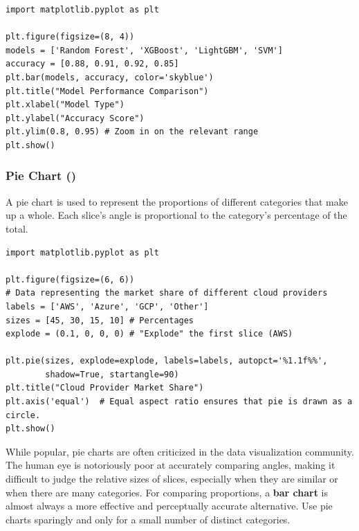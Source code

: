 \begin{example}
\text{ }\begin{verbatim}
import matplotlib.pyplot as plt

plt.figure(figsize=(8, 4))
models = ['Random Forest', 'XGBoost', 'LightGBM', 'SVM']
accuracy = [0.88, 0.91, 0.92, 0.85]
plt.bar(models, accuracy, color='skyblue')
plt.title("Model Performance Comparison")
plt.xlabel("Model Type")
plt.ylabel("Accuracy Score")
plt.ylim(0.8, 0.95) # Zoom in on the relevant range
plt.show()
\end{verbatim}
\end{example}

\subsubsection*{Pie Chart ()}
A pie chart is used to represent the proportions of different categories that make up a whole. Each slice's angle is proportional to the category's percentage of the total.

\begin{example}
\text{ }\begin{verbatim}
import matplotlib.pyplot as plt

plt.figure(figsize=(6, 6))
# Data representing the market share of different cloud providers
labels = ['AWS', 'Azure', 'GCP', 'Other']
sizes = [45, 30, 15, 10] # Percentages
explode = (0.1, 0, 0, 0) # "Explode" the first slice (AWS)

plt.pie(sizes, explode=explode, labels=labels, autopct='%1.1f%%',
        shadow=True, startangle=90)
plt.title("Cloud Provider Market Share")
plt.axis('equal')  # Equal aspect ratio ensures that pie is drawn as a circle.
plt.show()
\end{verbatim}
\end{example}

\begin{remark}
While popular, pie charts are often criticized in the data visualization community. The human eye is notoriously poor at accurately comparing angles, making it difficult to judge the relative sizes of slices, especially when they are similar or when there are many categories. For comparing proportions, a \textbf{bar chart} is almost always a more effective and perceptually accurate alternative. Use pie charts sparingly and only for a small number of distinct categories.
\end{remark}

